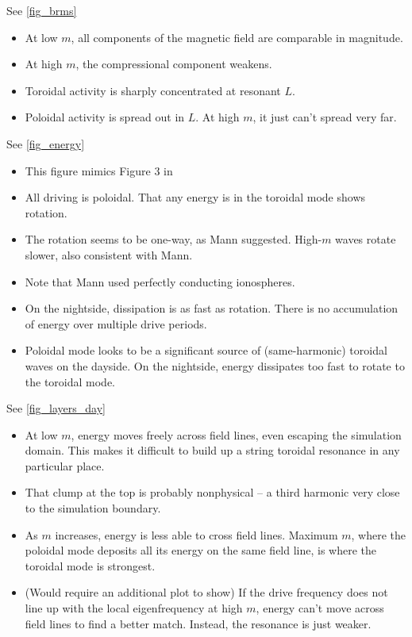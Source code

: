 \documentclass{article}
\newcommand{\azm}{\ensuremath{m}\xspace}
\begin{document}
See \cref{fig_brms}

\begin{itemize}
    \item At low \azm, all components of the magnetic field are comparable in magnitude.
    \item At high \azm, the compressional component weakens.
    \item Toroidal activity is sharply concentrated at resonant $L$.
    \item Poloidal activity is spread out in $L$. At high \azm, it just can't spread very far.
\end{itemize}

See \cref{fig_energy}

\begin{itemize}
    \item This figure mimics Figure 3 in \cite{mann_1995}
    \item All driving is poloidal. That any energy is in the toroidal mode shows rotation.
    \item The rotation seems to be one-way, as Mann suggested. High-\azm waves rotate slower, also consistent with Mann.
    \item Note that Mann used perfectly conducting ionospheres.
    \item On the nightside, dissipation is as fast as rotation. There is no accumulation of energy over multiple drive periods.
    \item Poloidal mode looks to be a significant source of (same-harmonic) toroidal waves on the dayside. On the nightside, energy dissipates too fast to rotate to the toroidal mode.
\end{itemize}

See \cref{fig_layers_day}

\begin{itemize}
    \item At low \azm, energy moves freely across field lines, even escaping the simulation domain. This makes it difficult to build up a string toroidal resonance in any particular place.
    \item That clump at the top is probably nonphysical -- a third harmonic very close to the simulation boundary.
    \item As \azm increases, energy is less able to cross field lines. Maximum \azm, where the poloidal mode deposits all its energy on the same field line, is where the toroidal mode is strongest.
    \item (Would require an additional plot to show) If the drive frequency does not line up with the local eigenfrequency at high \azm, energy can't move across field lines to find a better match. Instead, the resonance is just weaker.
\end{itemize}
\end{document}
